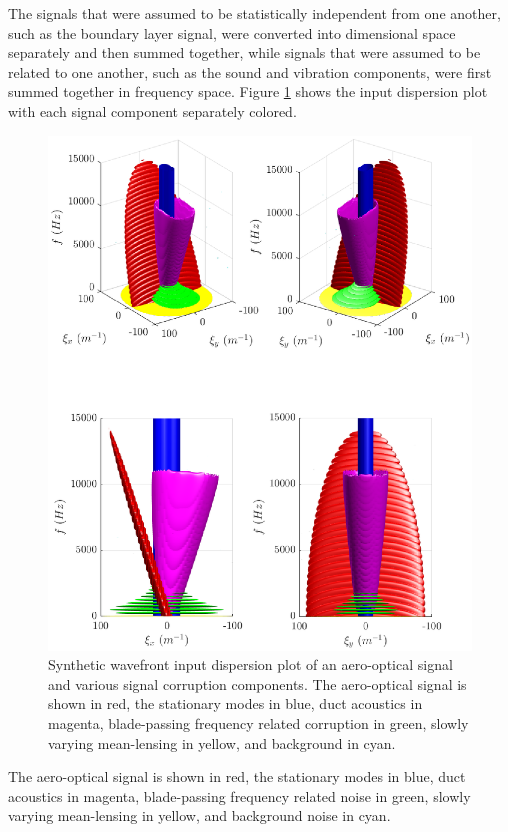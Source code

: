 The signals that were assumed to be statistically independent from one another, such as the boundary layer signal, were converted into dimensional space separately and then summed together, while signals that were assumed to be related to one another, such as the sound and vibration components, were first summed together in frequency space.
Figure \ref{fig:05_synthetic_dispersion_input} shows the input dispersion plot with each signal component separately colored.
\begin{figure}
 \centering
 \includegraphics{../matlab/05_synthetic_wavefront/synthetic_wavefront.eps}
 \caption{Synthetic wavefront input dispersion plot of an aero-optical signal and various signal corruption components.  The aero-optical signal is shown in red, the stationary modes in blue, duct acoustics in magenta, blade-passing frequency related corruption in green, slowly varying mean-lensing in yellow, and background in cyan.}
 \label{fig:05_synthetic_dispersion_input}
\end{figure}
The aero-optical signal is shown in red, the stationary modes in blue, duct acoustics in magenta, blade-passing frequency related noise in green, slowly varying mean-lensing in yellow, and background noise in cyan.


